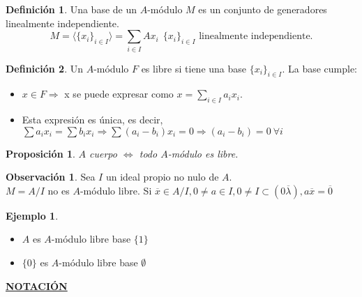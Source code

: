 \documentclass{article}
\theoremstyle{theorem-style}  %
\newtheorem{proposition}[theorem]{Proposición}
\theoremstyle{definition}
\newtheorem{definition}{Definición}[section]
\newtheorem*{observation}{Observación} %
\theoremstyle{example-style}
\newtheorem{example}{Ejemplo}[section]
\begin{document}
	\begin{definition} Una base de un $ A $-módulo $ M $ es un conjunto de generadores linealmente independiente.  \[ M=\langle \{x_i\}_{i\in I}\rangle=\sum_{i\in I} Ax_i\ \  \{x_i\}_{i\in I} \text{ linealmente independiente.} \] 
	\end{definition}
		
	\begin{definition}
		Un $ A $-módulo $ F $ es libre si tiene una base $\{x_i\}_{i\in I}$. La base cumple:
		\begin{itemize}
			\item $x\in F\Rightarrow$ x se puede expresar como $x=\sum_{i\in I}a_i x_i$.
			\item Esta expresión es única, es decir, $\sum a_i x_i=\sum b_i x_i \Rightarrow \sum (a_i-b_i)x_i=0\Rightarrow (a_i-b_i)=0 \ \forall i$
		\end{itemize}
	\end{definition}

	\begin{proposition}
		$ A $ cuerpo $ \Leftrightarrow $ todo $ A $-módulo es libre.
	\end{proposition}

	\begin{observation}
		Sea $ I $ un ideal propio no nulo de $ A $.\\
		$ M=A/I $ no es $ A $-módulo libre.
		Si $ \overline{x} \in A/I, 0\neq a\in I, 0\neq I \subset (0\overline{\lambda}), a\overline{x}=\overline{0} $
	\end{observation}
	\begin{example}

		\begin{itemize}
			\item $ A $ es $ A $-módulo libre base $ \{1\} $
			\item $ \{0\} $ es $ A $-módulo libre base $ \emptyset $
		\end{itemize}
	\end{example}
	
	\underline{\textbf{NOTACIÓN}}
\end{document}
